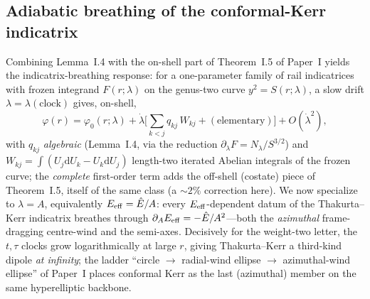 \documentclass[12pt]{iopart}
\theoremstyle{plain}
\theoremstyle{definition}
\theoremstyle{remark}
\newcommand{\Ehat}{\hat E}
\newcommand{\dd}{\mathrm{d}}
\begin{document}
\subsection{Adiabatic breathing of the conformal-Kerr indicatrix}
\label{sec:unified}
Combining Lemma~I.4 with the on-shell part of Theorem~I.5 of Paper~I yields the
indicatrix-breathing response: for a one-parameter family
of rail indicatrices with frozen integrand $F(r;\lambda)$ on the genus-two curve
$y^2=S(r;\lambda)$, a slow drift $\lambda=\lambda(\text{clock})$ gives, on-shell,
\begin{equation}
    \varphi(r)=\varphi_0(r;\lambda)+\dot\lambda\Big[\sum_{k<j} q_{kj}\,W_{kj}
    +(\text{elementary})\Big]+O(\dot\lambda^2),
    \label{eq:unified}
\end{equation}
with $q_{kj}$ \emph{algebraic} (Lemma~I.4, via the reduction $\partial_\lambda
F=N_\lambda/S^{3/2}$) and $W_{kj}=\int(U_j\dd U_k-U_k\dd U_j)$ length-two iterated Abelian
integrals of the frozen curve; the \emph{complete} first-order term adds the off-shell
(costate) piece of Theorem~I.5, itself of the same class (a $\sim2\%$ correction here). We
now specialize to $\lambda=A$, equivalently $E_{\rm eff}=\Ehat/A$: every
$E_{\rm eff}$-dependent datum of the Thakurta--Kerr indicatrix breathes through
$\partial_A E_{\rm eff}=-\Ehat/A^2$---both the \emph{azimuthal} frame-dragging centre-wind
and the semi-axes. Decisively for the weight-two letter, the $t,\tau$ clocks grow
logarithmically at large $r$, giving Thakurta--Kerr a third-kind dipole \emph{at
infinity}; the ladder ``circle $\to$ radial-wind ellipse $\to$ azimuthal-wind ellipse'' of
Paper~I places conformal Kerr as the last (azimuthal) member on the same hyperelliptic
backbone.
\end{document}
